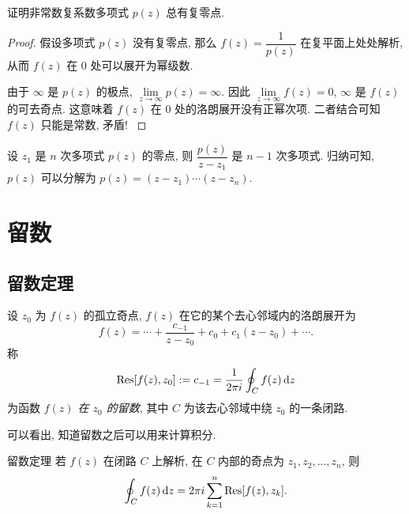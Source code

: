 \begin{example}
	证明非常数复系数多项式 $p(z)$ 总有复零点.
\end{example}

\begin{proof}
	假设多项式 $p(z)$ 没有复零点, 那么 $f(z)=\dfrac1{p(z)}$ 在复平面上处处解析, 
{%
	从而 $f(z)$ 在 $0$ 处可以展开为幂级数.
}

{%
	由于 $\infty$ 是 $p(z)$ 的极点, $\lim\limits_{z\to\infty}p(z)=\infty$.
}%
{%
	因此 $\lim\limits_{z\to\infty}f(z)=0$, $\infty$ 是 $f(z)$ 的可去奇点.
}%
{%
	这意味着 $f(z)$ 在 $0$ 处的洛朗展开没有正幂次项.
}%
{%
	二者结合可知 $f(z)$ 只能是常数, 矛盾!\qedhere
}
\end{proof}

设 $z_1$ 是 $n$ 次多项式 $p(z)$ 的零点, 则 $\dfrac{p(z)}{z-z_1}$ 是 $n-1$ 次多项式.
归纳可知, $p(z)$ 可以分解为 $p(z)=(z-z_1)\cdots(z-z_n)$.

\section{留数}

\subsection{留数定理}

\begin{definition}
	设 $z_0$ 为 $f(z)$ 的孤立奇点, $f(z)$ 在它的某个去心邻域内的洛朗展开为
		\[f(z)=\cdots+\frac{c_{-1}}{z-z_0}+c_0+c_1(z-z_0)+\cdots.\]
	称
		\[{\mathrm{Res}}[f(z),z_0]:=c_{-1}=\frac1{2\pi i}\oint_Cf(z)\,\mathrm{d} z\]
	为函数 \emph{$f(z)$ 在 $z_0$ 的留数}, 其中 $C$ 为该去心邻域中绕 $z_0$ 的一条闭路.
\end{definition}

可以看出, 知道留数之后可以用来计算积分.

\begin{main}{留数定理}
	若 $f(z)$ 在闭路 $C$ 上解析, 在 $C$ 内部的奇点为 $z_1,z_2,\dots,z_n$, 则
	\[\oint_Cf(z)\,\mathrm{d} z=2\pi i\sum_{k=1}^n{\mathrm{Res}}[f(z),z_k].\]
\end{main}


